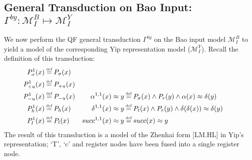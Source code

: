 \documentclass{article}
\newcommand\myeq{\mathrel{\stackrel{\makebox[0pt]{\mbox{\normalfont\tiny def}}}{=}}}
\newcommand{\ap}{\approx}
\begin{document}
\subsection{General Transduction on Bao Input: $\Gamma^{by}: \mathcal{M}^{B}_{I} \mapsto \mathcal{M}^{Y}_{I}$}
We now perform the QF general transduction $\Gamma^{by}$ on the Bao input model $\mathcal{M}^{B}_{I}$ to yield a model of the corresponding Yip representation model ($\mathcal{M}^{Y}_{I}$). Recall the definition of this transduction:
\begin{equation}
\begin{aligned}
P^{1}_{\sigma}(x)&\myeq P_{\sigma}(x) \\
P^{1}_{+u}(x)&\myeq P_{+u}(x) \\
P^{1}_{-u}(x)&\myeq P_{-u}(x) & \alpha^{1,1}(x)\ap y&\myeq P_{\sigma}(x) \land P_{r}(y) \land \alpha(x) \ap \delta(y) \\
P^{1}_{h}(x)&\myeq P_{h}(x) & \delta^{1,1}(x)\ap y&\myeq P_{t}(x)\land P_{r}(y) \land  \delta(\delta(x)) \ap \delta(y) \\
P^{1}_{l}(x)&\myeq P_{l}(x) & succ^{1,1}(x)\ap y&\myeq succ(x)\ap y \\
\end{aligned}
\end{equation}
The result of this transduction is a model of the Zhenhai form [LM.HL] in Yip's representation; `T', `c' and register nodes have been fused into a single register node.
\end{document}
